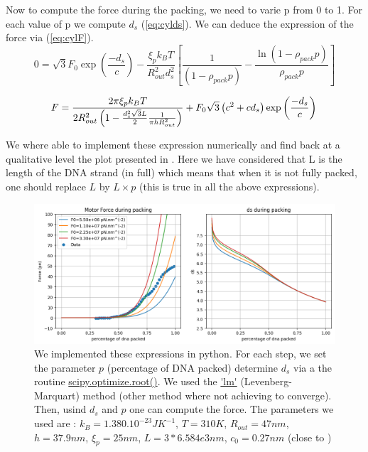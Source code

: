 \documentclass{article}
\begin{document}
Now to compute the force during the packing, we need to varie p from 0 to 1. For each value of p we compute $d_s$ (\ref{eq:cylds}). We can deduce the expression of the force via (\ref{eq:cylF}).
\begin{equation}
    0 = \sqrt{3} F_0 \exp \left( \frac{-d_s}{c} \right) - \frac{\xi_p k_B T}{R_{out}^2 d_s^2} \left[ \frac{1}{ \left( 1 - \rho_{pack} p\right)} - \frac{\ln \left( 1-\rho_{pack}p \right) }{\rho_{pack} p} \right] 
    \label{eq:cylds}
\end{equation}

\begin{equation}
    F = \frac{2 \pi \xi_p k_B T}{2 R_{out}^2 \left( 1 - \frac{d_s^2 \sqrt{3} L}{2} \frac{1}{\pi h R_{out}^2}\right) } + F_0 \sqrt{3} \left( c^2 + cd_s \right) \exp \left( \frac{-d_s}{c} \right) \\
    \label{eq:cylF}
\end{equation}

We where able to implement these expression numerically and find back at a qualitative level the plot presented in \cite{purohit2003}. Here we have considered that L is the length of the DNA strand (in full) which means that when it is not fully packed, one should replace $L$ by $L\times p$ (this is true in all the above expressions).

\begin{figure}
    \includegraphics[width=\textwidth]{Plot_ofTheForce_Cyl.png}
    \caption{We implemented these expressions in python. For each step, we set the parameter $p$ (percentage of DNA packed) determine $d_s$ via a the routine \url{scipy.optimize.root()}. We used the \url{'lm'} (Levenberg-Marquart) method (other method where not achieving to converge). Then, usind $d_s$ and $p$ one can compute the force. The parameters we used are : $k_B=1.380.10^{-23}JK^{-1}$, $T=310 K$, $R_{out} = 47 nm$, $h = 37.9 nm$, $ \xi_p = 25 nm$, $L = 3*6.584e3 nm$, $c_0 = 0.27 nm$ (close to \cite{purohit2003})}
\end{figure}
\end{document}
